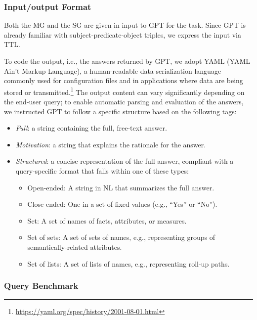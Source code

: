 \subsubsection{Input/output Format}
\label{sec:llm-in-out}

Both the MG and the SG are given in input to GPT for the task. Since GPT is already familiar with subject-predicate-object triples, we express the input via TTL.

To code the output, i.e., the answers returned by GPT, we adopt YAML (YAML Ain't Markup Language), a human-readable data serialization language commonly used for configuration files and in applications where data are being stored or
transmitted.\footnote{\url{https://yaml.org/spec/history/2001-08-01.html}}
The output content can vary significantly depending on the end-user query; to enable automatic parsing and evaluation of the answers, we instructed GPT to follow a specific structure based on the following tags:
\begin{itemize}
    \item \textit{Full}: a string containing the full, free-text answer.
    \item \textit{Motivation}: a string that explains the rationale for the answer.
    \item \textit{Structured}: a concise representation of the full answer, compliant with a query-specific format that falls within one of these types:
        \begin{itemize}
            \item Open-ended: A string in NL that summarizes the full answer.
            \item Close-ended: One in a set of fixed values (e.g., ``Yes'' or ``No'').
            \item Set: A set of names of facts, attributes, or measures.
            \item Set of sets: A set of sets of names, e.g., representing groups of semantically-related attributes.
            \item Set of lists: A set of lists of names, e.g., representing roll-up paths.
        \end{itemize}
\end{itemize}

\subsubsection{Query Benchmark}
\label{sec:llm-cases}

